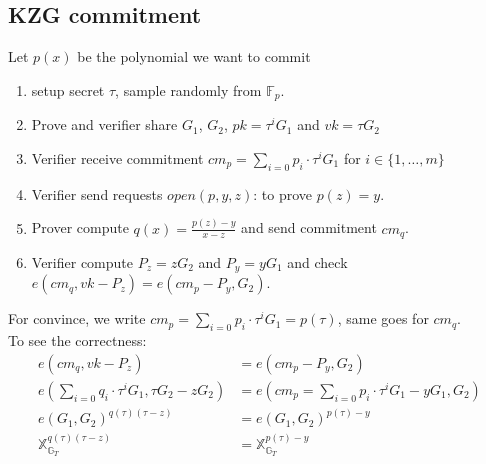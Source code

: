 \documentclass[10pt]{article}
\newcommand{\FField}{\mathbb{F}_p}
\begin{document}
\subsection{KZG commitment}
Let $p(x)$ be the polynomial we want to commit
\begin{enumerate}
    \item setup secret $\tau$, sample randomly from $\FField$.
    \item Prove and verifier share $G_1$, $G_2$, $pk = \tau^iG_1$ and $vk = \tau G_2$
    \item Verifier receive commitment ${cm}_p = \sum_{i=0}p_i \cdot \tau^iG_1$ for
        $i \in \{1, \ldots, m\}$
    \item Verifier send requests $open(p, y, z)$: to prove $p(z) = y$.
    \item Prover compute $q(x) = \frac{p(z) - y}{x-z}$ and send commitment
        ${cm}_q$.
    \item Verifier compute $P_z = zG_2$ and $P_y = yG_1$ and check 
        $e({cm}_q, vk-P_z) = e({cm}_p-P_y, G_2)$.
\end{enumerate}
For convince, we write $cm_{p} = \sum_{i=0}p_i \cdot \tau^iG_1 = p(\tau)$, same
goes for ${cm}_q$.\\
To see the correctness:
\[
\begin{aligned}
    e({cm}_q, vk-P_z) &= e({cm}_p-P_y, G_2)\\
    e(\sum_{i=0}q_i \cdot \tau^iG_1, \tau G_2-z G_2) &= e({cm}_p =
    \sum_{i=0}p_i \cdot \tau^iG_1-yG_1, G_2)\\
    e(G_1, G_2)^{q(\tau)(\tau - z)} &= e(G_1,G_2)^{p(\tau)-y}\\
    \mathbb{X}^{q(\tau)(\tau - z)}_{\mathbb{G}_T} &= \mathbb{X}^{p(\tau) - y}_{\mathbb{G}_T}
\end{aligned}
\]
\end{document}
